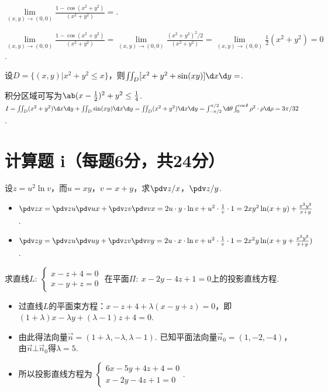 \begin{problem}
    $\lim\limits_{(x,y)\to(0,0)}\frac{1-\cos(x^2+y^2)}{(x^2+y^2)}=$.
\end{problem}
\begin{solution}
    $\lim\limits_{(x,y)\to(0,0)}\frac{1-\cos(x^2+y^2)}{(x^2+y^2)}=\lim\limits_{(x,y)\to(0,0)}\frac{(x^2+y^2)^2/2}{(x^2+y^2)}=\lim\limits_{(x,y)\to(0,0)}\frac12(x^2+y^2)=0$.
\end{solution}

\begin{problem}
    设$D=\{(x,y)|x^2+y^2\leq x\}$，则$\iint_D[x^2+y^2+\sin(xy)]\d x\d y=$.
\end{problem}
\begin{solution}
    积分区域可写为$\ab(x-\frac12)^2+y^2\leq\frac14$. $I=\iint_D(x^2+y^2)\d x\d y+\iint_D\sin(xy)\d x\d y=\iint_D(x^2+y^2)\d x\d y=\int_{-\pi/2}^{\pi/2}\d\theta\int_0^{\cos\theta}\rho^2\cdot\rho\d\rho=3\pi/32$.
\end{solution}

\section{计算题 i（每题6分，共24分）}

\begin{problem}
    设$z=u^2\ln v$，而$u=xy$，$v=x+y$，求$\pdv z/x$，$\pdv z/y$.
\end{problem}
\begin{solution}\leavevmode
\begin{itemize}
    \item $\pdv zx=\pdv zu\pdv ux+\pdv zv\pdv vx=2u\cdot y\cdot\ln v+u^2\cdot\frac1v\cdot1=2xy^2\ln(x+y)+\frac{x^2y^2}{x+y}$.
    \item $\pdv zy=\pdv zu\pdv uy+\pdv zv\pdv vy=2u\cdot x\cdot\ln v+u^2\cdot\frac1v\cdot1=2x^2y\ln(x+y+\frac{x^2y^2}{x+y})$.
\end{itemize}
\end{solution}

\begin{problem}
    求直线$L:\ 
    \begin{cases}
        x-z+4=0\\x-y+z=0
    \end{cases}$
    在平面$\Pi:\ x-2y-4z+1=0$上的投影直线方程.
\end{problem}
\begin{solution}\leavevmode
    \begin{itemize}
        \item 过直线$L$的平面束方程：$x-z+4+\lambda(x-y+z)=0$，即$(1+\lambda)x-\lambda y+(\lambda-1)z+4=0$.
        \item 由此得法向量$\vec n=(1+\lambda,-\lambda,\lambda-1)$. 已知平面法向量$\vec n_0=(1,-2,-4)$，由$\vec n\bot\vec n_0$得$\lambda=5$.
        \item 所以投影直线方程为
        $\begin{cases}
            6x-5y+4z+4=0\\
            x-2y-4z+1=0
        \end{cases}$.
    \end{itemize}
\end{solution}

